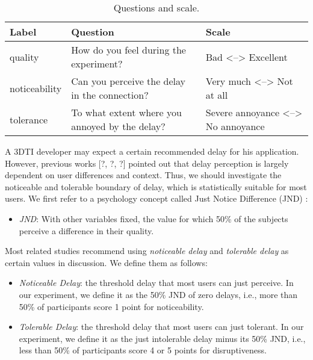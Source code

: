 \begin{table} [!htbp]
\begin{tabular}{|p{}|p{}|p{}|}
\hline 
Label & Question & Scale \\
\hline
quality & How do you feel during the experiment? &Bad <--> Excellent \\
\hline
noticeability & Can you perceive the delay in the connection? & Very much <--> Not at all \\
\hline
tolerance & To what extent where you annoyed by the delay? & Severe annoyance <--> No annoyance \\
\hline
\end{tabular}
\caption{Questions and scale.}
\label{tab:table_questionnaire}
\end{table}

A 3DTI developer may expect a certain recommended delay for his application. However, previous works \cite{montagud2012inter} [?, ?, ?] pointed out that delay perception is largely dependent on user differences and context. Thus, we should investigate the noticeable and tolerable boundary of delay, which is statistically suitable for most users. We first refer to a psychology concept called Just Notice Difference (JND) \cite{xu2013exploiting, sat2009statistical}:

\begin{itemize}
    \item \emph{JND}: With other variables fixed, the value for which 50\% of the subjects perceive a difference in their quality.
\end{itemize}

Most related studies recommend using \emph{noticeable delay} and \emph{tolerable delay} as certain values in discussion. We define them as follows:

\begin{itemize}
    \item \emph{Noticeable Delay}: the threshold delay that most users can just perceive. In our experiment, we define it as the 50\% JND of zero delays, i.e., more than 50\% of participants score 1 point for noticeability.
    
    \item \emph{Tolerable Delay}: the threshold delay that most users can just tolerant. In our experiment, we define it as the just intolerable delay minus its 50\% JND, i.e., less than 50\% of participants score 4 or 5 points for disruptiveness.
\end{itemize}

